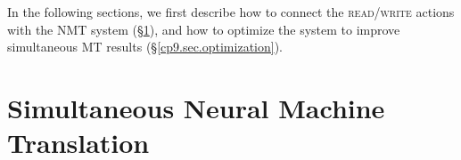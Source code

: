 
In the following sections, we first describe how to connect the \textsc{read}/\textsc{write} actions with the NMT system (\S\ref{cp9.sec.framework}), and how to optimize the system to improve simultaneous MT results (\S\ref{cp9.sec.optimization}).



\section{Simultaneous Neural Machine Translation}
\label{cp9.sec.framework}


